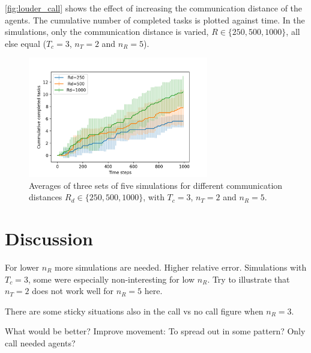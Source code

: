 \documentclass[11pt]{article}
\begin{document}
    \autoref{fig:louder_call} shows the effect of increasing the communication 
    distance of the agents. The cumulative number of completed tasks is plotted 
    against time. In the simulations, only the communication distance is varied,
    $R \in \{250, 500, 1000\}$, all else equal ($T_c = 3$, $n_T=2$ and $n_R=5$).

    \begin{figure}
        \centering
        \includegraphics[width=0.7\textwidth]{figures/louder_call.png}
        \caption{
            Averages of three sets of five simulations for different 
            communication distances $R_d \in \{250, 500, 1000\}$,
            with $T_c = 3$, $n_T=2$ and $n_R=5$.
        }
        \label{fig:louder_call}
    \end{figure}

    \section{Discussion}

    For lower $n_R$ more simulations are needed. Higher relative error.
    Simulations with $T_c=3$, some were especially non-interesting for low $n_R$.
    Try to illustrate that $n_T = 2$ does not work well for $n_R = 5$ here. 

    There are some sticky situations also in the call vs no call figure when $n_R=3$.

    What would be better? Improve movement: To spread out in some pattern? Only call needed agents?

    \printbibliography
\end{document}
